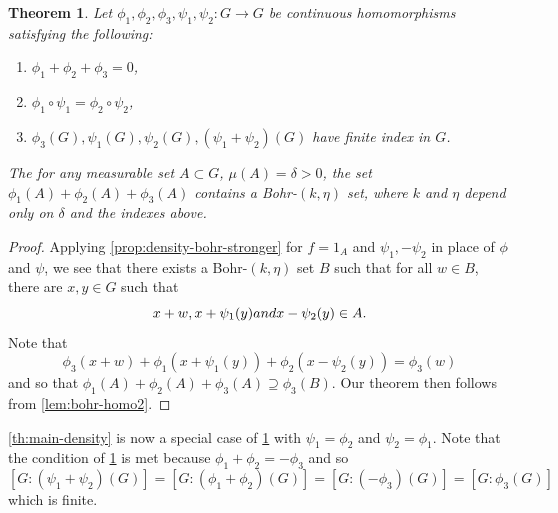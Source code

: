 \documentclass[10pt]{article}
\newtheorem{theorem}{Theorem}[section]
\theoremstyle{definition}
\begin{document}
\begin{theorem} \label{th:main-density-true}
Let $\phi_1, \phi_2, \phi_3, \psi_1, \psi_2: G \rightarrow G$ be continuous homomorphisms satisfying the following:
\begin{enumerate}
\item $\phi_1 + \phi_2 + \phi_3=0$,
\item $\phi_1 \circ \psi_1 = \phi_2 \circ \psi_2$,
\item $\phi_3(G), \psi_1(G), \psi_2(G), (\psi_1 + \psi_2)(G)$ have finite index in $G$.
\end{enumerate}
The for any measurable set $A \subset G$, $\mu(A) = \delta >0$, the set $\phi_1(A) + \phi_2(A) + \phi_3(A)$ contains a Bohr-$(k, \eta)$ set, where $k$ and $\eta$ depend only on $\delta$ and the indexes above. 
\end{theorem}
\begin{proof}
Applying \cref{prop:density-bohr-stronger} for $f=1_A$ and $\psi_1, -\psi_2$ in place of $\phi$ and $\psi$, we see that there exists a Bohr-$(k,\eta)$ set $B$ such that for all $w \in B$, there are $x, y \in G$ such that
\[
x+w , x+\psi_1(y) \textup{ and } x-\psi_{2}(y) \in A.
\]
Note that
\[
\phi_3(x + w) + \phi_1(x+\psi_1(y)) + \phi_2(x-\psi_2(y)) = \phi_3(w)
\]
and so that $\phi_1(A) + \phi_2(A) + \phi_3(A) \supseteq \phi_3(B)$.
Our theorem then follows from \cref{lem:bohr-homo2}.
\end{proof}

\cref{th:main-density} is now a special case of \cref{th:main-density-true} with $\psi_1 = \phi_2$ and $\psi_2 = \phi_1$. Note that the condition of \cref{th:main-density-true} is met because $\phi_1 + \phi_2 = - \phi_3$ and so
\[
    [G: (\psi_1 + \psi_2)(G)] = [G:(\phi_1 + \phi_2)(G)] = [G:(-\phi_3)(G)] = [G: \phi_3(G)]
\]
which is finite.
\end{document}
